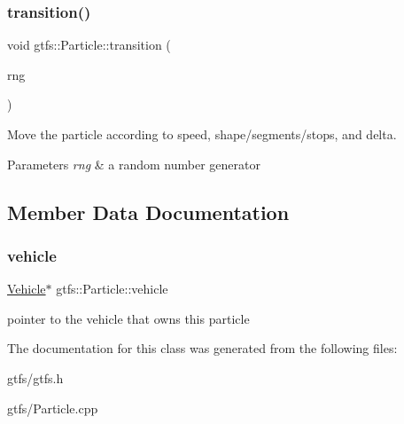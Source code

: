 \subsubsection{\texorpdfstring{transition()}{transition()}}
{\footnotesize\ttfamily void gtfs\+::\+Particle\+::transition (\begin{DoxyParamCaption}\item[{\hyperlink{classsampling_1_1RNG}{sampling\+::\+R\+NG} \&}]{rng }\end{DoxyParamCaption})}

Move the particle according to speed, shape/segments/stops, and {\ttfamily delta}.


\begin{DoxyParams}{Parameters}
{\em rng} & a random number generator \\
\hline
\end{DoxyParams}


\subsection{Member Data Documentation}
\mbox{\label{classgtfs_1_1Particle_a81c313d505ecb592d79463f167dfb76c}} 
\subsubsection{\texorpdfstring{vehicle}{vehicle}}
{\footnotesize\ttfamily \hyperlink{classgtfs_1_1Vehicle}{Vehicle}$\ast$ gtfs\+::\+Particle\+::vehicle}

pointer to the vehicle that owns this particle 

The documentation for this class was generated from the following files\+:\begin{DoxyCompactItemize}
\item 
gtfs/gtfs.\+h\item 
gtfs/Particle.\+cpp\end{DoxyCompactItemize}
